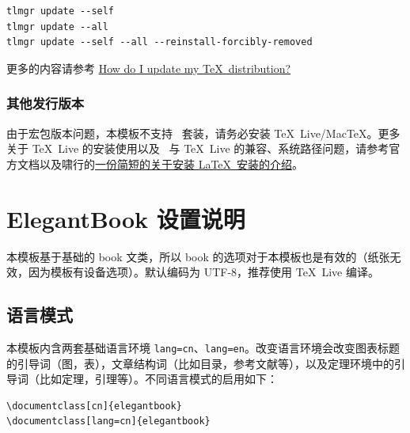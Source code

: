 \documentclass[lang=cn,newtx,10pt,scheme=chinese]{elegantbook}
\begin{document}
\begin{lstlisting}
tlmgr update --self 
tlmgr update --all
tlmgr update --self --all --reinstall-forcibly-removed
\end{lstlisting}

更多的内容请参考 \href{https://tex.stackexchange.com/questions/55437/how-do-i-update-my-tex-distribution}{How do I update my \TeX\ distribution?}

\subsection{其他发行版本}

由于宏包版本问题，本模板不支持 \CTeX\ 套装，请务必安装 \TeX~Live/Mac\TeX。更多关于 \TeX~Live 的安装使用以及 \CTeX\ 与 \TeX~Live 的兼容、系统路径问题，请参考官方文档以及啸行的\href{https://github.com/OsbertWang/install-latex-guide-zh-cn/releases/}{一份简短的关于安装 \LaTeX\ 安装的介绍}。



\chapter{ElegantBook 设置说明}

本模板基于基础的 book 文类，所以 book 的选项对于本模板也是有效的（纸张无效，因为模板有设备选项）。默认编码为 UTF-8，推荐使用 \TeX~Live 编译。

\section{语言模式}
本模板内含两套基础语言环境 \lstinline{lang=cn}、\lstinline{lang=en}。改变语言环境会改变图表标题的引导词（图，表），文章结构词（比如目录，参考文献等），以及定理环境中的引导词（比如定理，引理等）。不同语言模式的启用如下：
\begin{lstlisting}
\documentclass[cn]{elegantbook} 
\documentclass[lang=cn]{elegantbook}
\end{lstlisting}
\end{document}
